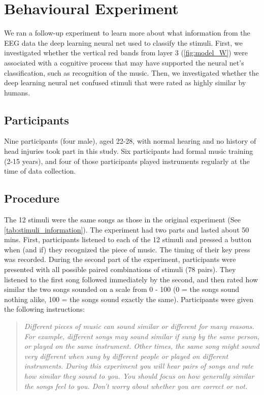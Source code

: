 \chapter{Behavioural Experiment}
We ran a follow-up experiment to learn more about what information from the EEG data the deep learning neural net used to classify the stimuli. 
First, we investigated whether the vertical red bands from layer 3 (\autoref{fig:model_W}) were associated with a cognitive process that may have supported the neural net's classification, such as recognition of the music. 
Then, we investigated whether the deep learning neural net confused stimuli that were rated as highly similar by humans.
\section{Participants}
Nine participants (four male), aged 22-28, with normal hearing and no history of head injuries took part in this study. 
Six participants had formal music training (2-15 years), and four of those participants played instruments regularly at the time of data collection. 
\section{Procedure}
The 12 stimuli were the same songs as those in the original experiment (See \autoref{tab:stimuli_information}).
The experiment had two parts and lasted about 50 mins.
First, participants listened to each of the 12 stimuli and pressed a button when (and if) they recognized the piece of music.
The timing of their key press was recorded. 
During the second part of the experiment, participants were presented with all possible paired combinations of stimuli (78 pairs). 
They listened to the first song followed immediately by the second, and then rated how similar the two songs sounded on a scale from 0 - 100 (0 = the songs sound nothing alike, 100 = the songs sound exactly the same).
Participants were given the following instructions:
\begin{quote}\textit{
Different pieces of music can sound similar or different for many reasons.
For example, different songs may sound similar if sung by the same person, or played on the same instrument.
Other times, the same song might sound very different when sung by different people or played on different instruments.
During this experiment you will hear pairs of songs and rate how similar they sound to you.
You should focus on how generally similar the songs feel to you. Don't worry about whether you are correct or not.}
\end{quote}

